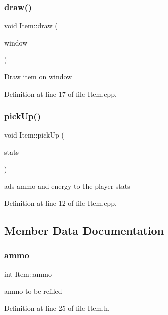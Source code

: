 \subsubsection{\texorpdfstring{draw()}{draw()}}
{\footnotesize\ttfamily void Item\+::draw (\begin{DoxyParamCaption}\item[{sf\+::\+Render\+Window \&}]{window }\end{DoxyParamCaption})\hspace{0.3cm}{\ttfamily [override]}}

Draw item on window 

Definition at line 17 of file Item.\+cpp.

\mbox{\label{class_item_a149c95695cc750a3f2de14eb4ed6ef21}} 
\subsubsection{\texorpdfstring{pick\+Up()}{pickUp()}}
{\footnotesize\ttfamily void Item\+::pick\+Up (\begin{DoxyParamCaption}\item[{\hyperlink{struct_player_stats}{Player\+Stats} \&}]{stats }\end{DoxyParamCaption})}

ads ammo and energy to the player stats 

Definition at line 12 of file Item.\+cpp.



\subsection{Member Data Documentation}
\mbox{\label{class_item_a621a125c6d736a8d44a27129fba48068}} 
\subsubsection{\texorpdfstring{ammo}{ammo}}
{\footnotesize\ttfamily int Item\+::ammo}

ammo to be refiled 

Definition at line 25 of file Item.\+h.

\mbox{\label{class_item_a5ee3cebbf90b766991c74d09bd5d12bd}} 
